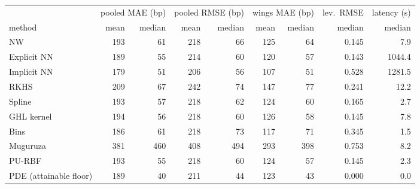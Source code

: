 \begin{tabular}{l rr rr rr r r}
\toprule
 & \multicolumn{2}{c}{pooled MAE (bp)} & \multicolumn{2}{c}{pooled RMSE (bp)} & \multicolumn{2}{c}{wings MAE (bp)} & lev.\ RMSE & latency (s)\\
\cmidrule(lr){2-3}\cmidrule(lr){4-5}\cmidrule(lr){6-7}
method & mean & median & mean & median & mean & median & median & median\\
\midrule
NW & 193 & 61 & 218 & 66 & 125 & 64 & 0.145 & 7.9\\
Explicit NN & 189 & 55 & 214 & 60 & 120 & 57 & 0.143 & 1044.4\\
Implicit NN & 179 & 51 & 206 & 56 & 107 & 51 & 0.528 & 1281.5\\
RKHS & 209 & 67 & 242 & 74 & 147 & 77 & 0.241 & 12.2\\
Spline & 193 & 57 & 218 & 62 & 124 & 60 & 0.165 & 2.7\\
GHL kernel & 194 & 56 & 218 & 60 & 126 & 58 & 0.145 & 7.8\\
Bins & 186 & 61 & 218 & 73 & 117 & 71 & 0.345 & 1.5\\
Muguruza & 381 & 460 & 408 & 494 & 293 & 398 & 0.753 & 8.2\\
PU-RBF & 193 & 55 & 218 & 60 & 124 & 57 & 0.145 & 2.3\\
PDE (attainable floor) & 189 & 40 & 211 & 44 & 123 & 43 & 0.000 & 0.0\\
\bottomrule
\end{tabular}
